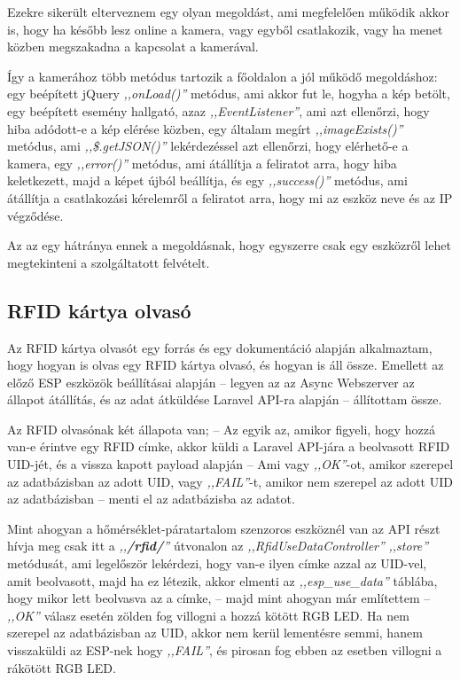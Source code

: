 \documentclass[
]{thesis-ekf}
\theoremstyle{definition}
\theoremstyle{remark}
\begin{document}
	Ezekre sikerült elterveznem egy olyan megoldást, ami megfelelően működik akkor is, hogy ha később lesz online a kamera, vagy egyből csatlakozik, vagy ha menet közben megszakadna a kapcsolat a kamerával. 
	
	Így a kamerához több metódus tartozik a főoldalon a jól működő megoldáshoz: egy beépített jQuery \emph{,,onLoad()''} metódus, ami akkor fut le, hogyha a kép betölt, egy beépített esemény hallgató, azaz \emph{,,EventListener''}, ami azt ellenőrzi, hogy hiba adódott-e a kép elérése közben, egy általam megírt \emph{,,imageExists()''} metódus, ami \emph{,,\$.getJSON()''} lekérdezéssel azt ellenőrzi, hogy elérhető-e a kamera, egy \emph{,,error()''} metódus, ami átállítja a feliratot arra, hogy hiba keletkezett, majd a képet újból beállítja, és egy \emph{,,success()''} metódus, ami átállítja a csatlakozási kérelemről a feliratot arra, hogy mi az eszköz neve és az IP végződése.
	
	Az az egy hátránya ennek a megoldásnak, hogy egyszerre csak egy eszközről lehet megtekinteni a szolgáltatott felvételt.
	 
	\subsection{RFID kártya olvasó}\label{rfid-working}
	
	Az RFID kártya olvasót egy forrás\cite{RFID-card-reader} és egy  dokumentáció\cite{rfid-datasheet} alapján alkalmaztam, hogy hogyan is olvas egy RFID kártya olvasó, és hogyan is áll össze. Emellett az előző ESP eszközök beállításai alapján -- legyen az az Async Webszerver az állapot átállítás, és az adat átküldése Laravel API-ra alapján -- állítottam össze.
	
	Az RFID olvasónak két állapota van; -- Az egyik az, amikor figyeli, hogy hozzá van-e érintve egy RFID címke, akkor küldi a Laravel API-jára a beolvasott RFID UID-jét, és a vissza kapott payload alapján -- Ami vagy \emph{,,OK''}-ot, amikor szerepel az adatbázisban az adott UID, vagy \emph{,,FAIL''}-t, amikor nem szerepel az adott UID az adatbázisban -- menti el az adatbázisba az adatot. 
	
	Mint ahogyan a hőmérséklet-páratartalom szenzoros eszköznél van az API részt hívja meg csak itt a \emph{,,\textbf{/rfid/}''} útvonalon az \emph{,,RfidUseDataController''} \emph{,,store''} metódusát, ami legelőször lekérdezi, hogy van-e ilyen címke azzal az UID-vel, amit beolvasott, majd ha ez létezik, akkor elmenti az \emph{,,esp\_use\_data''} táblába, hogy mikor lett beolvasva az a címke, -- majd mint ahogyan már említettem -- \emph{,,OK''} válasz esetén zölden fog villogni a hozzá kötött RGB LED. Ha nem szerepel az adatbázisban az UID, akkor nem kerül lementésre semmi, hanem visszaküldi az ESP-nek hogy \emph{,,FAIL''}, és pirosan fog ebben az esetben villogni a rákötött RGB LED.
	
\end{document}
